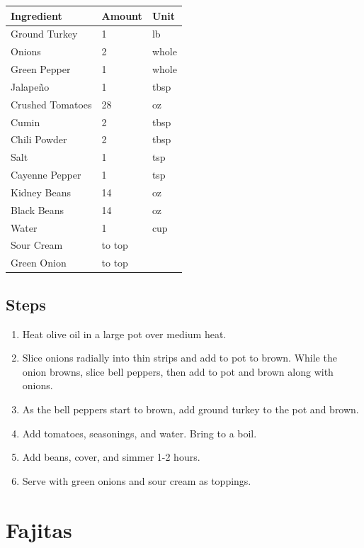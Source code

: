 \documentclass[11pt,]{article}
\begin{document}
\begin{tabular}{l|l|l}
\hline
Ingredient & Amount & Unit\\
\hline
Ground Turkey & 1 & lb\\
\hline
Onions & 2 & whole\\
\hline
Green Pepper & 1 & whole\\
\hline
Jalapeño & 1 & tbsp\\
\hline
Crushed Tomatoes & 28 & oz\\
\hline
Cumin & 2 & tbsp\\
\hline
Chili Powder & 2 & tbsp\\
\hline
Salt & 1 & tsp\\
\hline
Cayenne Pepper & 1 & tsp\\
\hline
Kidney Beans & 14 & oz\\
\hline
Black Beans & 14 & oz\\
\hline
Water & 1 & cup\\
\hline
Sour Cream & to top & \\
\hline
Green Onion & to top & \\
\hline
\end{tabular}

\subsection{Steps}\label{steps-1}

\begin{enumerate}
\def\labelenumi{\arabic{enumi}.}
\item
  Heat olive oil in a large pot over medium heat.
\item
  Slice onions radially into thin strips and add to pot to brown. While
  the onion browns, slice bell peppers, then add to pot and brown along
  with onions.
\item
  As the bell peppers start to brown, add ground turkey to the pot and
  brown.
\item
  Add tomatoes, seasonings, and water. Bring to a boil.
\item
  Add beans, cover, and simmer 1-2 hours.
\item
  Serve with green onions and sour cream as toppings.
\end{enumerate}

\break 

\section{Fajitas}\label{fajitas}
\end{document}
